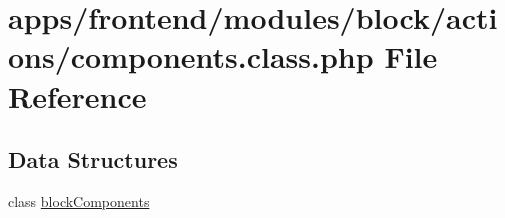 \hypertarget{frontend_2modules_2block_2actions_2components_8class_8php}{\section{apps/frontend/modules/block/actions/components.class.\-php File Reference}
\label{frontend_2modules_2block_2actions_2components_8class_8php}
}
\subsection*{Data Structures}
\begin{DoxyCompactItemize}
\item 
class \hyperlink{classblock_components}{block\-Components}
\end{DoxyCompactItemize}
